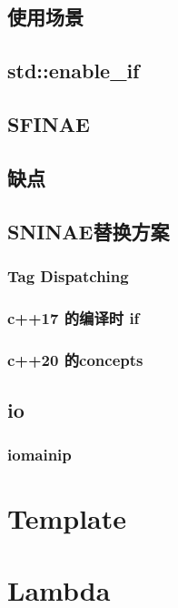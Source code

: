 \documentclass{article}
\begin{document}
\subsection{使用场景}
\subsection{std::enable\_if}
\subsection{SFINAE}
\subsection{缺点}
\subsection{SNINAE替换方案}
\subsubsection{Tag Dispatching}
\subsubsection{c++17 的编译时 if}
\subsubsection{c++20 的concepts}


\subsection{io}
\subsubsection{iomainip}


\section{Template}








\section{Lambda}
\end{document}
